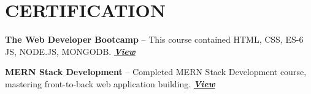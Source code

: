 \section{CERTIFICATION}
\resumeSubHeadingListStart
    \resumeProjectHeading
    {\textbf{The Web Developer Bootcamp } -- This course contained HTML, CSS, ES-6 JS, NODE.JS, MONGODB.}    {\href{https://udemy-certificate.s3.amazonaws.com/pdf/UC-W4I4QJ5Y.pdf}{\textit{\textbf{View}}}}


    \resumeProjectHeading
    {\textbf{MERN Stack Development} -- Completed MERN Stack Development course, mastering front-to-back web application building.}    {\href{https://udemy-certificate.s3.amazonaws.com/pdf/UC-W4I4QJ5Y.pdf}{\textit{\textbf{View}}}}
\resumeSubHeadingListEnd